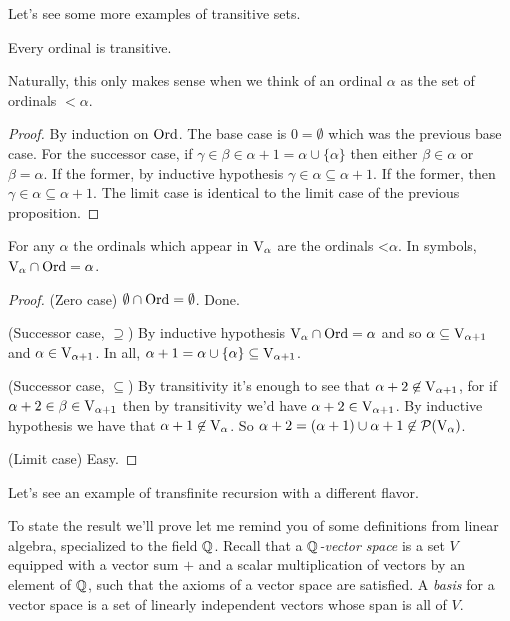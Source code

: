 \documentclass[10pt]{amsart}
\begin{document}
Let's see some more examples of transitive sets.

\begin{proposition}
Every ordinal is transitive.
\end{proposition}

Naturally, this only makes sense when we think of an ordinal $\alpha$ as the set of ordinals $< \alpha$.

\begin{proof}
By induction on $\mathrm{Ord}$. The base case is $0 = \emptyset$ which was the previous base case. For the successor case, if $\gamma \in \beta \in \alpha + 1 = \alpha \cup \{\alpha\}$ then either $\beta \in \alpha$ or $\beta = \alpha$. If the former, by inductive hypothesis $\gamma \in \alpha \subseteq \alpha+1$. If the former, then $\gamma \in \alpha \subseteq \alpha+1$. The limit case is identical to the limit case of the previous proposition.
\end{proof}

\begin{proposition} \label{prop:ord-cap-v}
For any $\alpha$ the ordinals which appear in $\mathrm{V}_\alpha$ are the ordinals $\mathord<\alpha$. In symbols, $\mathrm{V}_\alpha \cap \mathrm{Ord} = \alpha$. 
\end{proposition}

\begin{proof}
(Zero case) $\emptyset \cap \mathrm{Ord} = \emptyset$. Done. 

(Successor case, $\supseteq$) By inductive hypothesis $\mathrm{V}_\alpha \cap \mathrm{Ord} = \alpha$ and so $\alpha \subseteq \mathrm{V}_{\alpha+1}$ and $\alpha \in \mathrm{V}_{\alpha+1}$. In all, $\alpha + 1 = \alpha \cup \{\alpha\} \subseteq \mathrm{V}_{\alpha+1}$. 

(Successor case, $\subseteq$) By transitivity it's enough to see that $\alpha+2 \not \in \mathrm{V}_{\alpha+1}$, for if $\alpha+2 \in \beta \in \mathrm{V}_{\alpha+1}$ then by transitivity we'd have $\alpha+2\in \mathrm{V}_{\alpha+1}$. By inductive hypothesis we have that $\alpha+1 \not \in \mathrm{V}_\alpha$. So $\alpha+2 = (\alpha+1) \cup{\alpha+1} \not \in \mathcal{P}(\mathrm{V}_\alpha)$.

(Limit case) Easy.
\end{proof}

Let's see an example of transfinite recursion with a different flavor. 

To state the result we'll prove let me remind you of some definitions from linear algebra, specialized to the field $\mathbb{Q}$. Recall that a \emph{$\mathbb{Q}$-vector space} is a set $V$ equipped with a vector sum $+$ and a scalar multiplication of vectors by an element of $\mathbb{Q}$, such that the axioms of a vector space are satisfied. A \emph{basis} for a vector space is a set of linearly independent vectors whose span is all of $V$.
\end{document}

